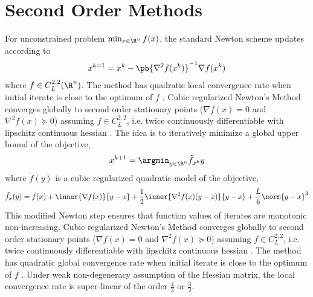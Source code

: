 \documentclass[../summary.tex]{subfiles}
\begin{document}
 
\section{Second Order Methods}

For unconstrained problem $\min_{x\in\R^n} f(x)$, the standard Newton scheme updates according to
\begin{align} 
    x^{k=1} 
        = x^k - \pb{\nabla^2 f(x^k)}^{-1} \nabla f(x^k)
\end{align} 
where $f \in C_{L}^{2,2}(\R^n)$. The method has quadratic local convergence rate when initial iterate is close to the optimum of $f$ \cite{nesterovIntroductoryLecturesConvex2004}. Cubic regularized Newton's Method converges globally to second order stationary points ($\nabla f(x) = 0$ and $\nabla^2 f(x) \succeq 0$) assuming $f\in C_{L}^{2,2}$, i.e. twice continuously differentiable with lipschitz continuous hessian \cite{nesterovCubicRegularizationNewton2006, nesterovCubicRegularizationNewton2006a}. The idea is to iteratively minimize a global upper bound of the objective,
\begin{align}
    x^{k+1} =  \argmin_{y\in\R^n} \tilde{f}_{x^k}{y}
\end{align}
where $\tilde{f}(y)$ is a cubic regularized quadratic model of the objective,
\begin{align} 
    \tilde{f}_{x}(y)
        = f(x) + \inner{\nabla f(x)}{y-x} + \frac{1}{2}\inner{\nabla^2 f(x)(y-x)}{y-x} + \frac{L}{6}\norm{y-x}^3
\end{align} 
This modified Newton step ensures that function values of iterates are monotonic non-increasing. Cubic regularized Newton's Method converges globally to second order stationary points ($\nabla f(x) = 0$ and $\nabla^2 f(x) \succeq 0$) assuming $f\in C_{L}^{2,2}$, i.e. twice continuously differentiable with lipschitz continuous hessian \cite{nesterovCubicRegularizationNewton2006, nesterovCubicRegularizationNewton2006a}.  The method has quadratic global convergence rate when initial iterate is close to the optimum of $f$ \cite{nesterovIntroductoryLecturesConvex2004}. Under weak non-degeneracy assumption of the Hessian matrix, the local convergence rate is super-linear of the order $\frac{4}{3}$ or $\frac{3}{2}$.
\end{document}
